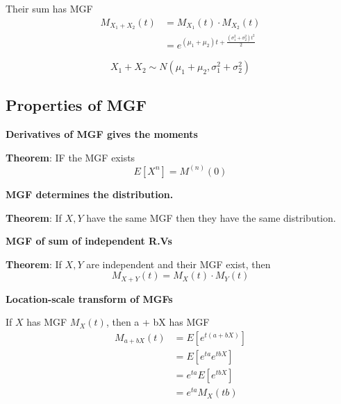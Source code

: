 Their sum has MGF
\begin{align*}
   M_{X_1 + X_2}(t) &= M_{X_1}(t) \cdot M_{X_2}(t) \\
                    &= e^{(\mu_1 + \mu_2)t + \frac{ \left( \sigma_1^2 + \sigma_2^2 \right) t^2}{2}}
\end{align*}

\[
  X_1 + X_2 \sim N(\mu_1 + \mu_2, \sigma_1^2 + \sigma_2^2 )
\] 



\subsection{Properties of MGF}

\textbf{Derivatives of MGF gives the moments} 
\begin{framed}
   \textbf{Theorem}: IF the MGF exists
   \[
      E\left[ X^n\right]  = M^{(n)} (0) 
   \] 
\end{framed}

\textbf{MGF determines the distribution.}
\begin{framed}
   \textbf{Theorem}: If $X, Y$ have the same MGF then they have the same distribution. 
\end{framed}

\textbf{MGF of sum of independent R.Vs}
\begin{framed}
   \textbf{Theorem}: If $X, Y$ are independent and their MGF exist, then 
   \[
      M_{X  + Y}(t) = M_X(t) \cdot M_Y(t) 
   \] 
\end{framed}

\textbf{Location-scale transform of MGFs}
\begin{framed}
   If $X$ has MGF $M_X(t)$, then a + bX has MGF
   \begin{align*}
      M_{a + bX} (t) &= E\left[ e^{t (a + bX)}\right]  \\
                     &= E\left[ e^{ta} e^{tbX}\right]  \\
                     &= e^{ta} E\left[ e^{tbX}\right]  \\
                     &= e^{ta } M_X(tb)
   \end{align*}
   
  
\end{framed}




